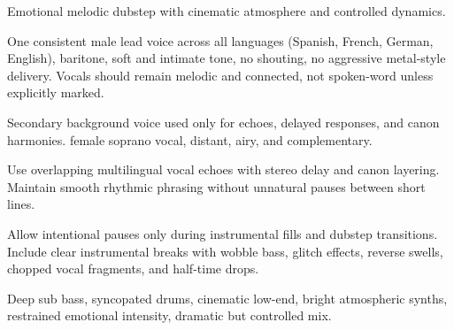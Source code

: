 

\begin{notes}
\end{notes}
\begin{style}
Emotional melodic dubstep with cinematic atmosphere and controlled dynamics. 

One consistent male lead voice across all languages (Spanish, French, German, English), baritone, soft and intimate tone, no shouting, no aggressive metal-style delivery. %
Vocals should remain melodic and connected, not spoken-word unless explicitly marked.

Secondary background voice used only for echoes, delayed responses, and canon harmonies. %
female soprano vocal, distant, airy, and complementary.

Use overlapping multilingual vocal echoes with stereo delay and canon layering. %
Maintain smooth rhythmic phrasing without unnatural pauses between short lines.

Allow intentional pauses only during instrumental fills and dubstep transitions. %
Include clear instrumental breaks with wobble bass, glitch effects, reverse swells, chopped vocal fragments, and half-time drops.

Deep sub bass, syncopated drums, cinematic low-end, bright atmospheric synths, restrained emotional intensity, dramatic but controlled mix.
\end{style}
